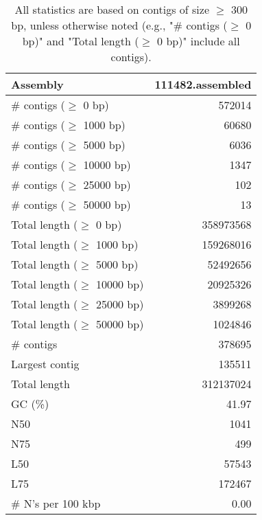 \documentclass[12pt,a4paper]{article}
\begin{document}
\begin{table}[ht]
\begin{center}
\caption{All statistics are based on contigs of size $\geq$ 300 bp, unless otherwise noted (e.g., "\# contigs ($\geq$ 0 bp)" and "Total length ($\geq$ 0 bp)" include all contigs).}
\begin{tabular}{|l*{1}{|r}|}
\hline
Assembly & 111482.assembled \\ \hline
\# contigs ($\geq$ 0 bp) & 572014 \\ \hline
\# contigs ($\geq$ 1000 bp) & 60680 \\ \hline
\# contigs ($\geq$ 5000 bp) & 6036 \\ \hline
\# contigs ($\geq$ 10000 bp) & 1347 \\ \hline
\# contigs ($\geq$ 25000 bp) & 102 \\ \hline
\# contigs ($\geq$ 50000 bp) & 13 \\ \hline
Total length ($\geq$ 0 bp) & 358973568 \\ \hline
Total length ($\geq$ 1000 bp) & 159268016 \\ \hline
Total length ($\geq$ 5000 bp) & 52492656 \\ \hline
Total length ($\geq$ 10000 bp) & 20925326 \\ \hline
Total length ($\geq$ 25000 bp) & 3899268 \\ \hline
Total length ($\geq$ 50000 bp) & 1024846 \\ \hline
\# contigs & 378695 \\ \hline
Largest contig & 135511 \\ \hline
Total length & 312137024 \\ \hline
GC (\%) & 41.97 \\ \hline
N50 & 1041 \\ \hline
N75 & 499 \\ \hline
L50 & 57543 \\ \hline
L75 & 172467 \\ \hline
\# N's per 100 kbp & 0.00 \\ \hline
\end{tabular}
\end{center}
\end{table}
\end{document}

